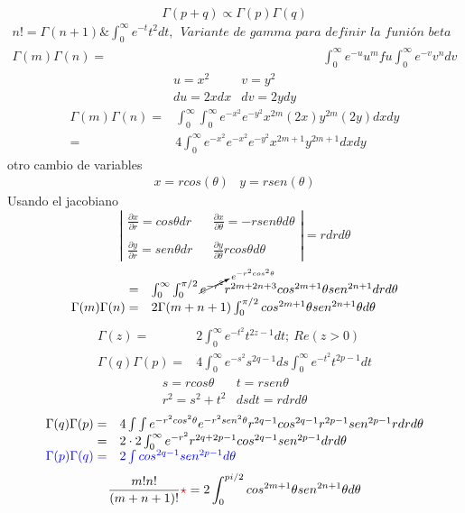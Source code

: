 \documentclass{article}
\theoremstyle{definition}
\begin{document}
\[\Gamma (p+q)\propto \Gamma (p)\Gamma (q)\]
\[
\begin{array}{rl}
	n!= \Gamma (n+1)\& \int^{\infty}_0 e^{-t}t^2 dt,\ \ \textit{Variante de gamma para definir la funión beta}\\
	\Gamma (m)\Gamma (n)=& \int^{\infty}_0 e^{-u}u^m fu\int^{\infty}_0 e^{-v}v^n dv
\end{array}
\]
\[
\begin{array}{cc}
	u=x^2 & v=y^2\\
	du=2xdx & dv= 2ydy
\end{array}
\]
\[
\begin{array}{rl}
	\Gamma (m)\Gamma (n) =& \int^{\infty}_0 \int^{\infty}_0e^{-x^{2}}e^{-y^{2}}x^{2m}(2x)y^{2m}(2y)dxdy\\
	=& 4\int^{\infty}_0 e^{-x^{2}} e^{-x^{2}}e^{-y^{2}}x^{2m+1}y^{2m+1}dxdy
\end{array}
\]
otro cambio de variables
\[
\begin{array}{cc}
	x=rcos(\theta) & y=rsen(\theta)
\end{array}
\]
Usando el jacobiano
\[
\left|
\begin{array}{ccc}
	\frac{\partial x}{\partial r}= cos\theta dr && \frac{\partial x}{\partial \theta} =-rsen\theta d\theta\\
	\\
	\frac{\partial y}{\partial r} = sen\theta dr && \frac{\partial y}{\partial \theta} r cos\theta d\theta
\end{array}\right|
=rdrd\theta
\]
\[
\begin{array}{rl}
	=& \int^{\infty}_0\int^{\pi/2}_0 \cancelto{e^{-r^2cos^2\theta}}{e^{-r^2}} r^{2m+2n+3} cos^{2m+1}\theta sen ^{2n+1}drd\theta\\
	\Gamma (m)\Gamma (n) =& 2 \Gamma (m+n+1)\int^{\pi/2}_0 cos^{2m+1}\theta sen^{2n+1}\theta d\theta
\end{array}
\]
\[
\begin{array}{rl}
	\Gamma (z)=& 2 \int^{\infty}_0 e^{-t^2}t^{2z-1}dt;\ Re(z>0)\\
	\Gamma (q)\Gamma (p) =& 4\int^{\infty}_0 e^{-s^2} s^{2q-1}ds\int^{\infty}_0 e^{-t^2}t^{2p-1}dt
\end{array}
\]
\[
\begin{array}{cc}
	s=rcos\theta & t=rsen\theta\\
	r^2=s^2+t^2 & dsdt=rdrd\theta
\end{array}
\]
\[
\begin{array}{rl}
	\Gamma (q)\Gamma (p)=& 4\int\int e^{-r^2cos^2\theta}e^{-r^2sen^2\theta}r^{2q-1}cos^{2q-1}r^{2p-1}sen^{2p-1}rdrd\theta\\
	=& 2\cdot 2 \int^{\infty}_0 e^{-r^2}r^{2q+2p-1}cos^{2q-1}sen^{2p-1}drd\theta\\
	\textcolor{blue}{\Gamma (p)\Gamma (q)=}&\textcolor{blue}{2\int cos^{2q-1}sen^{2p-1} d\theta}
\end{array}
\]
\[\frac{m! n!}{(m+n+1)!}\textcolor{red}{\star}= 2\int^{pi /2}_0 cos^{2m+1}\theta sen^{2n+1}\theta d \theta\]
\end{document}
